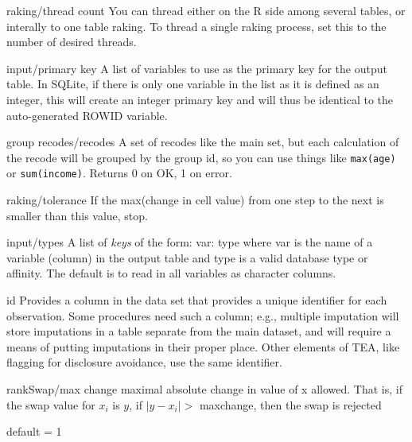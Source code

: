 \begin{key}{raking/thread count}
 You can thread either on the R side among several tables,
     or interally to one table raking. To thread a single raking process, set this to the
     number of desired threads. 
     
\end{key}

\begin{key}{input/primary key}
 A list of variables to use as the primary key for the output table.
In SQLite, if there is only one variable in the list as it is defined as an integer,
this will create an integer primary key and will thus be identical to the auto-generated
ROWID variable.
\end{key}

\begin{key}{group recodes/recodes}
 A set of recodes like the main set, but each calculation of the recode will be grouped by the group id, so you can use things like {\tt max(age)} or {\tt sum(income)}.
Returns 0 on OK, 1 on error.

\end{key}

\begin{key}{raking/tolerance}
     If the max(change in cell value) from one step to the next
       is smaller than this value, stop. 
\end{key}

\begin{key}{input/types}
 A list of \emph{keys} of the form:
var: type
where var is the name of a variable (column) in the output table and type is a valid
database type or affinity.  The default is to read in all variables as character
columns.
\end{key}

\begin{key}{id}
 Provides a column in the data set that provides a unique identifier for each
observation.
Some procedures need such a column; e.g., multiple imputation will store imputations in a
table separate from the main dataset, and will require a means of putting imputations in
their proper place. Other elements of TEA, like flagging for disclosure avoidance, use the
same identifier.
\end{key}

\begin{key}{rankSwap/max change}
 maximal absolute change in value of x allowed.
That is, if the swap value for $x_i$ is $y$, if $|y - x_i| >$ maxchange,
then the swap is rejected

default = 1
\end{key}

